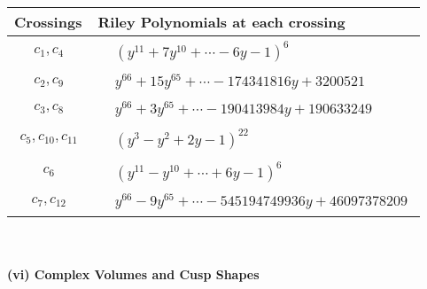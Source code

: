 \documentclass[1p]{elsarticle_modified}
\theoremstyle{definition}
\begin{document}
\begin{tabular}{m{50pt}|m{274pt}}
Crossings & \hspace{64pt}Riley Polynomials at each crossing \\
\hline $$\begin{aligned}c_{1},c_{4}\end{aligned}$$&$\begin{aligned}
&(y^{11}+7 y^{10}+\cdots-6 y-1)^{6}
\end{aligned}$\\
\hline $$\begin{aligned}c_{2},c_{9}\end{aligned}$$&$\begin{aligned}
&y^{66}+15 y^{65}+\cdots-174341816 y+3200521
\end{aligned}$\\
\hline $$\begin{aligned}c_{3},c_{8}\end{aligned}$$&$\begin{aligned}
&y^{66}+3 y^{65}+\cdots-190413984 y+190633249
\end{aligned}$\\
\hline $$\begin{aligned}c_{5},c_{10},c_{11}\end{aligned}$$&$\begin{aligned}
&(y^3- y^2+2 y-1)^{22}
\end{aligned}$\\
\hline $$\begin{aligned}c_{6}\end{aligned}$$&$\begin{aligned}
&(y^{11}- y^{10}+\cdots+6 y-1)^{6}
\end{aligned}$\\
\hline $$\begin{aligned}c_{7},c_{12}\end{aligned}$$&$\begin{aligned}
&y^{66}-9 y^{65}+\cdots-545194749936 y+46097378209
\end{aligned}$\\
\hline
\end{tabular}\\~\\
\newpage\flushleft \textbf{(vi) Complex Volumes and Cusp Shapes}
\end{document}
